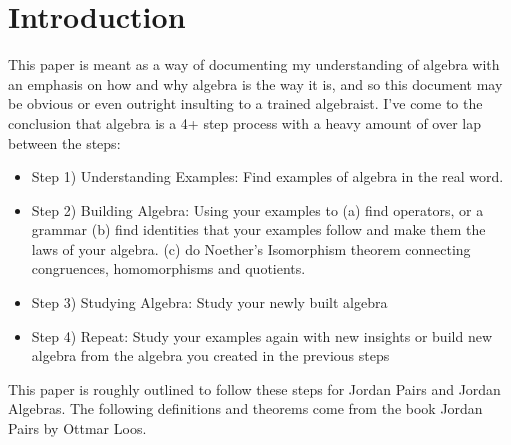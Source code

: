 \section{Introduction}
This paper is meant as a way of documenting my understanding of 
algebra with an emphasis on how and why algebra is the way it is, 
and so this document may be obvious or even outright insulting to a trained algebraist.
I've come to the conclusion that algebra is a 4+ step process with a heavy amount of over lap between the steps:
\begin{itemize}
\item[]\hspace{-20pt}Step 1) Understanding Examples: Find examples of algebra in the real word. 
\item[]\hspace{-20pt}Step 2) Building Algebra: Using your examples to (a) find operators, or a grammar (b) find identities that your examples follow and make them the laws of your algebra. (c) do Noether's Isomorphism theorem connecting congruences, homomorphisms and quotients.
\item[]\hspace{-20pt}Step 3) Studying Algebra: Study your newly built algebra %
\item[]\hspace{-20pt}Step 4) Repeat: Study your examples again with new insights or build new algebra from the algebra you created in the previous steps
\end{itemize}

This paper is roughly outlined to follow these steps for Jordan Pairs and Jordan Algebras. The following definitions and theorems come from the book Jordan Pairs by Ottmar Loos.

